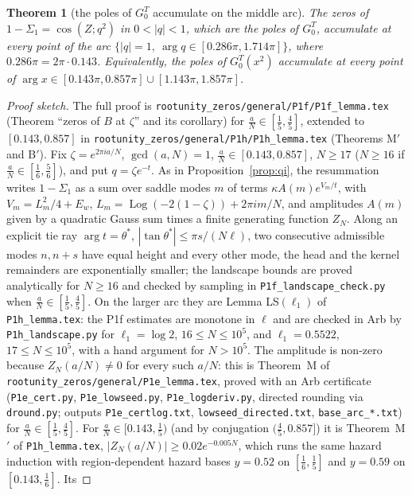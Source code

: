 \documentclass[11pt]{article}
\theoremstyle{plain}
\newtheorem{theorem}{Theorem}
\theoremstyle{definition}
\theoremstyle{remark}
\theoremstyle{plain}\newtheorem*{maintheorem}{Main Theorem}
\begin{document}
\begin{theorem}[the poles of $G^T_0$ accumulate on the middle arc]\label{thm:arc}
The zeros of $1-\Sigma_1=\cos(Z;q^2)$ in $0<|q|<1$, which are the poles of $G^T_0$, accumulate at
every point of the arc $\{|q|=1,\ \arg q\in[0.286\pi,1.714\pi]\}$, where $0.286\pi=2\pi\cdot0.143$. Equivalently, the poles of
$G^T_0(x^2)$ accumulate at every point of $\arg x\in[0.143\pi,0.857\pi]\cup[1.143\pi,1.857\pi]$.
\end{theorem}

\begin{proof}[Proof sketch]
The full proof is \texttt{rootunity\_zeros/general/P1f/P1f\_lemma.tex} (Theorem ``zeros of $B$ at
$\zeta$'' and its corollary) for $\frac aN\in[\frac15,\frac45]$, extended to $[0.143,0.857]$ in
\texttt{rootunity\_zeros/general/P1h/P1h\_lemma.tex} (Theorems M$'$ and B$'$). Fix $\zeta=e^{2\pi ia/N}$, $\gcd(a,N)=1$, $\frac aN\in[0.143,0.857]$,
$N\ge17$ ($N\ge16$ if $\frac aN\in[\frac16,\frac56]$),
and put $q=\zeta e^{-t}$. As in Proposition~\ref{prop:qi}, the resummation writes $1-\Sigma_1$ as a sum
over saddle modes $m$ of terms $\kappa A(m)e^{V_m/t}$, with $V_m=L_m^2/4+E_w$, $L_m=\operatorname{Log}(-2(1-\zeta))+2\pi im/N$,
and amplitudes $A(m)$ given by a quadratic Gauss sum times a finite generating function $Z_N$. Along an
explicit tie ray $\arg t=\theta^\ast$, $|\tan\theta^\ast|\le\pi s/(N\ell)$, two consecutive admissible
modes $n,n+s$ have equal height and every other mode, the head and the kernel remainders are
exponentially smaller; the landscape bounds are proved analytically for $N\ge16$ and checked by
sampling in \texttt{P1f\_landscape\_check.py} when $\frac aN\in[\frac15,\frac45]$. On the larger arc they are Lemma LS$(\ell_1)$ of
\texttt{P1h\_lemma.tex}: the P1f estimates are monotone in $\ell$ and are checked in Arb by \texttt{P1h\_landscape.py}
for $\ell_1=\log2$, $16\le N\le10^5$, and $\ell_1=0.5522$, $17\le N\le10^5$, with a hand argument for $N>10^5$. The amplitude is non-zero because $Z_N(a/N)\ne0$ for
every such $a/N$: this is Theorem~M of \texttt{rootunity\_zeros/general/P1e\_lemma.tex}, proved with an
Arb certificate (\texttt{P1e\_cert.py}, \texttt{P1e\_lowseed.py}, \texttt{P1e\_logderiv.py}, directed
rounding via \texttt{dround.py}; outputs \texttt{P1e\_certlog.txt}, \texttt{lowseed\_directed.txt},
\texttt{base\_arc\_*.txt}) for $\frac aN\in[\frac15,\frac45]$. For $\frac aN\in[0.143,\frac15)$ (and by conjugation
$(\frac45,0.857]$) it is Theorem~M$'$ of \texttt{P1h\_lemma.tex}, $|Z_N(a/N)|\ge0.02e^{-0.005N}$, which runs the same hazard
induction with region-dependent hazard bases $y=0.52$ on $[\frac16,\frac15]$ and $y=0.59$ on $[0.143,\frac16]$. Its

\end{proof}
\end{document}
